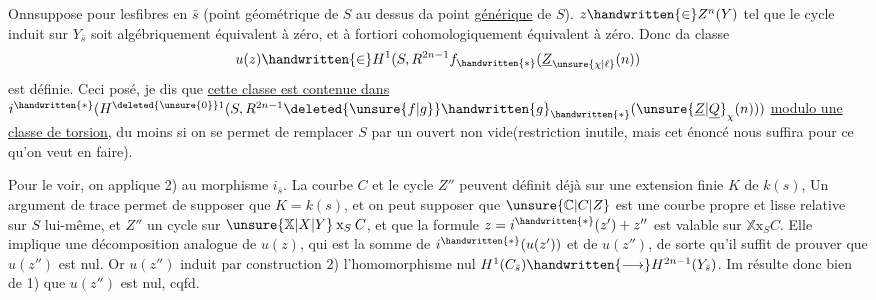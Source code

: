 Onnsuppose   pour lesfibres en $\bar s$ (point géométrique  de $S$ au dessus da point \uline{générique} de $S$).    $z\handwritten{\in}Z^n(Y)$ tel que le cycle induit sur $Y_{\bar s}$ soit algébriquement équivalent à zéro, et à fortiori cohomologiquement équivalent à zéro. Donc da classe
\[
u(z)\handwritten{\in}H^1(S,R^{2n-1}f_{\handwritten{*}}(\underline{Z}_{\unsure{\chi|\ell}}(n))
\]
est définie. Ceci posé, je dis que \uline{cette classe est  contenue dans} $i^{\handwritten{*}}(H^{\deleted{\unsure{0}}1}(S,R^{2n-1}\deleted{\unsure{f|g}}\handwritten{g}_{\handwritten{*}}({\unsure{\underline{Z}|\underline{Q}}}_{\chi}(n)))$ \uline{modulo une classe de torsion}, du moins si on    se permet de remplacer $S$ par un ouvert non vide(restriction  inutile, mais cet énoncé nous suffira pour ce qu'on veut en faire).

Pour le voir, on applique 2) au morphisme $i_{\bar s}$. La courbe $C$ et le cycle $Z''$ peuvent  définit déjà sur une extension finie $K$ de $k(s)$, Un argument de trace permet de supposer que $K=k(s)$, et  on peut supposer que $\unsure{\mathbb{C}|C|Z}$  est une courbe propre et lisse relative sur $S$ lui-même, et $Z''$ un cycle sur $\unsure{\mathbb{X}|X|Y}\mathbin{\mathrm{x}}_S C$,  et que la formule $z=i^{\handwritten{*}}(z')+z''$ est valable sur $\mathbb{X}\mathbin{\mathrm{x}}_S C$. Elle implique une décomposition analogue de $u(z)$, qui est la somme de $i^{\handwritten{*}}(u(z'))$ et de $u(z'')$, de sorte qu'il suffit de prouver que $u(z'')$ est nul. Or $u(z'')$ induit par construction 2) l'homomorphisme nul $H^1(C_{\bar s})\handwritten{\longrightarrow}H^{2n-1}(Y_{\bar s})$. Im résulte donc bien de 1) que $u(z'')$ est nul, cqfd.

